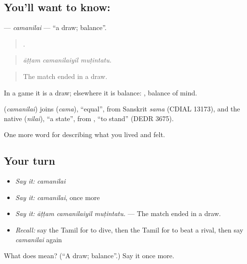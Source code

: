 \subsection*{You'll want to know: }
\textbf{} — \emph{camanilai} — \textquotedblleft{}a draw; balance\textquotedblright{}.

\begin{quote}
  .
\end{quote}

\begin{quote}
\emph{āṭṭam camanilaiyil muṭintatu.}
\end{quote}

\begin{quote}
The match ended in a draw.
\end{quote}

In a game it is a draw; elsewhere it is balance:  , balance of mind.

\begin{cousinweb}
\textbf{} (\emph{camanilai}) joins  (\emph{cama}), \textquotedblleft{}equal\textquotedblright{}, from Sanskrit \emph{sama} (CDIAL 13173), and the native  (\emph{nilai}), \textquotedblleft{}a state\textquotedblright{}, from , \textquotedblleft{}to stand\textquotedblright{} (DEDR 3675).
\end{cousinweb}

\begin{grammarlens}[title={What you've built}]
One more word for describing what you lived and felt.
\end{grammarlens}

\subsection*{Your turn}
\begin{itemize}
\raggedright
  \item \emph{Say it:} \emph{camanilai}
  \item \emph{Say it:} \emph{camanilai}, once more
  \item \emph{Say it:} \emph{āṭṭam camanilaiyil muṭintatu.} — The match ended in a draw.
  \item \emph{Recall:} say the Tamil for to dive, then the Tamil for to beat a rival, then say \emph{camanilai} again
\end{itemize}

\begin{tcolorbox}[breakable,colback=teal!4,colframe=teal!35!black,title={Before you move on}]
What does  mean? (\textquotedblleft{}A draw; balance\textquotedblright{}.) Say it once more.
\end{tcolorbox}
